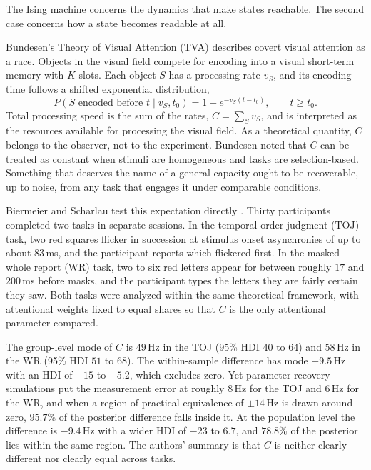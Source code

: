 \documentclass[11pt]{article}
\theoremstyle{definition}
\theoremstyle{remark}
\begin{document}
The Ising machine concerns the dynamics that make states reachable. The second case concerns how a state becomes readable at all.

Bundesen's Theory of Visual Attention (TVA) \cite{bundesen1990} describes covert visual attention as a race. Objects in the visual field compete for encoding into a visual short-term memory with $K$ slots. Each object $S$ has a processing rate $v_S$, and its encoding time follows a shifted exponential distribution,
\begin{equation}
P(\text{$S$ encoded before } t \mid v_S, t_0) = 1 - e^{-v_S (t - t_0)}, \qquad t \geq t_0 .
\end{equation}
Total processing speed is the sum of the rates, $C = \sum_S v_S$, and is interpreted as the resources available for processing the visual field. As a theoretical quantity, $C$ belongs to the observer, not to the experiment. Bundesen noted that $C$ can be treated as constant when stimuli are homogeneous and tasks are selection-based. Something that deserves the name of a general capacity ought to be recoverable, up to noise, from any task that engages it under comparable conditions.

Biermeier and Scharlau test this expectation directly \cite{biermeier2026}. Thirty participants completed two tasks in separate sessions. In the temporal-order judgment (TOJ) task, two red squares flicker in succession at stimulus onset asynchronies of up to about $83$\,ms, and the participant reports which flickered first. In the masked whole report (WR) task, two to six red letters appear for between roughly $17$ and $200$\,ms before masks, and the participant types the letters they are fairly certain they saw. Both tasks were analyzed within the same theoretical framework, with attentional weights fixed to equal shares so that $C$ is the only attentional parameter compared.

The group-level mode of $C$ is $49$\,Hz in the TOJ (95\% HDI $40$ to $64$) and $58$\,Hz in the WR (95\% HDI $51$ to $68$). The within-sample difference has mode $-9.5$\,Hz with an HDI of $-15$ to $-5.2$, which excludes zero. Yet parameter-recovery simulations put the measurement error at roughly $8$\,Hz for the TOJ and $6$\,Hz for the WR, and when a region of practical equivalence of $\pm 14$\,Hz is drawn around zero, $95.7\%$ of the posterior difference falls inside it. At the population level the difference is $-9.4$\,Hz with a wider HDI of $-23$ to $6.7$, and $78.8\%$ of the posterior lies within the same region. The authors' summary is that $C$ is neither clearly different nor clearly equal across tasks.
\end{document}
